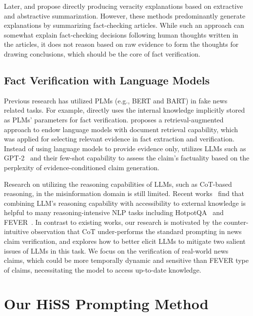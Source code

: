 \documentclass[11pt]{article}
\begin{document}
Later, 
\citet{atanasova2020generating} and \citet{kotonya2020explainable} propose directly producing veracity explanations based on extractive and abstractive summarization. However, these methods predominantly generate explanations by summarizing fact-checking articles. While such an approach can somewhat explain fact-checking decisions following human thoughts written in the articles, it does not reason based on raw evidence to form the thoughts for drawing conclusions, which should be the core of fact verification.

\subsection{Fact Verification with Language Models}
Previous research has utilized PLMs (e.g., BERT and BART) in fake news related tasks. For example, \citet{lee2020language} directly uses the internal knowledge implicitly stored as PLMs' parameters for fact verification. \citet{lewis2020retrieval} proposes a retrieval-augmented approach to endow language models with document retrieval capability, which was applied for selecting relevant evidence in fact extraction and verification. Instead of using language models to provide evidence only, \citet{lee2021towards} utilizes LLMs such as GPT-2~\cite{radford2019language} and their few-shot capability to assess the claim's factuality based on the perplexity of evidence-conditioned claim generation. 

Research on utilizing the reasoning capabilities of LLMs, such as CoT-based reasoning, in the misinformation domain is still limited. 
Recent works~\cite{press2022measuring,yao2023react,jiang2023active} find that combining LLM's reasoning capability with accessibility to external knowledge is helpful to many reasoning-intensive NLP tasks including HotpotQA~\cite{yang2018hotpotqa} and FEVER~\cite{thorne2018fever}. In contrast to existing works, our research is motivated by the counter-intuitive observation that CoT under-performs the standard prompting in news claim verification, and explores how to better elicit LLMs to mitigate two salient issues of LLMs in this task. We focus on the verification of real-world news claims, which could be more temporally dynamic and sensitive than FEVER type of claims, necessitating the model to access up-to-date knowledge.

\section{Our HiSS Prompting Method}
\end{document}
